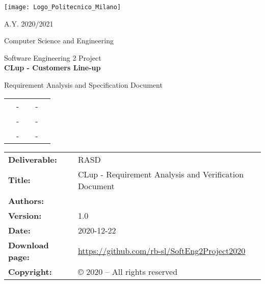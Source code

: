 


	
	\begin{titlepage}
		
		\centering
		\texttt{[image: Logo\_Politecnico\_Milano]}
		
		\Large 
		A.Y. 2020/2021
		
		Computer Science and Engineering
		
		\LARGE
		Software Engineering 2 Project
		\\ [3cm]
		
		\textbf{\color{Blue} \Huge CLup - Customers Line-up}
		
		Requirement Analysis and Specification
		Document
		\\ [1cm]
	
		\Large
		\begin{tabu}{ccccc}
			& - & & - & \\
			& - & & - & \\
			& - & & - & 
		\end{tabu}
	
	\end{titlepage}
	
	\begin{table}[h!]
		\begin{tabu} to \textwidth { X[0.3,r,p] X[0.7,l,p] }
			\hline
			\textbf{Deliverable:} 	& RASD\\
			\textbf{Title:} 		& CLup - Requirement Analysis and Verification Document \\
			\textbf{Authors:}		& \\
			\textbf{Version:} 		& 1.0 \\ 
			\textbf{Date:} 			& 2020-12-22 \\
			\textbf{Download page:} & \href{https://github.com/rb-sl/SoftEng2Project2020}{https://github.com/rb-sl/SoftEng2Project2020} \\
			\textbf{Copyright:} 	& © 2020 – All rights reserved \\
			\hline
		\end{tabu}
	\end{table}
	
	\setcounter{page}{2}
	
	\newpage	
	\tableofcontents
	
